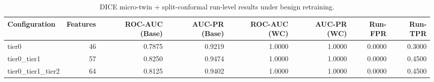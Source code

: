 \begin{table}[t]
\centering
\caption{DICE micro-twin + split-conformal run-level results under benign retraining.}
\label{tab:dice_full_overall}
\footnotesize
\begin{tabular}{lrrrrrrr}
\toprule
Configuration & Features & ROC-AUC (Base) & AUC-PR (Base) & ROC-AUC (WC) & AUC-PR (WC) & Run-FPR & Run-TPR \\
\midrule
tier0 & 46 & 0.7875 & 0.9219 & 1.0000 & 1.0000 & 0.0000 & 0.3000 \\
tier0_tier1 & 57 & 0.8250 & 0.9474 & 1.0000 & 1.0000 & 0.0000 & 0.4500 \\
tier0_tier1_tier2 & 64 & 0.8125 & 0.9402 & 1.0000 & 1.0000 & 0.0000 & 0.4500 \\
\bottomrule
\end{tabular}

\end{table}
